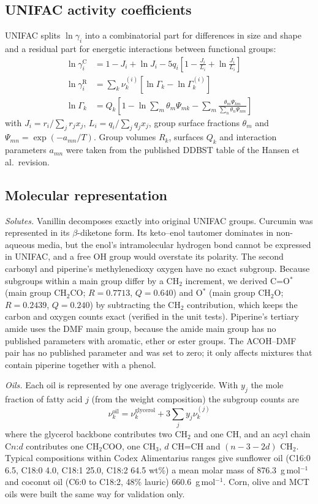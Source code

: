 \documentclass[journal=jceaax,manuscript=article,layout=twocolumn]{achemso}
\begin{document}
\subsection{UNIFAC activity coefficients}
UNIFAC splits $\ln\gamma_i$ into a combinatorial part for differences in size and shape and a residual part for energetic interactions between functional groups:\cite{fredenslund1975}
\begin{align}
\ln\gamma_i^\mathrm{C} &= 1-J_i+\ln J_i-5q_i\left[1-\frac{J_i}{L_i}+\ln\frac{J_i}{L_i}\right]\\
\ln\gamma_i^\mathrm{R} &= \sum_k \nu_k^{(i)}\left[\ln\Gamma_k-\ln\Gamma_k^{(i)}\right]\\
\ln\Gamma_k &= Q_k\left[1-\ln\sum_m\theta_m\Psi_{mk}-\sum_m\frac{\theta_m\Psi_{km}}{\sum_n\theta_n\Psi_{nm}}\right]
\end{align}
with $J_i=r_i/\sum_j r_jx_j$, $L_i=q_i/\sum_j q_jx_j$, group surface fractions $\theta_m$ and $\Psi_{mn}=\exp(-a_{mn}/T)$. Group volumes $R_k$, surfaces $Q_k$ and interaction parameters $a_{mn}$ were taken from the published DDBST table of the Hansen et al.\ revision.\cite{hansen1991,ddbst}

\subsection{Molecular representation}
\textit{Solutes.} Vanillin decomposes exactly into original UNIFAC groups. Curcumin was represented in its $\beta$-diketone form. Its keto--enol tautomer dominates in non-aqueous media,\cite{manolova2014} but the enol's intramolecular hydrogen bond cannot be expressed in UNIFAC, and a free OH group would overstate its polarity. The second carbonyl and piperine's methylenedioxy oxygen have no exact subgroup. Because subgroups within a main group differ by a CH$_2$ increment, we derived C=O$^*$ (main group CH$_2$CO; $R=0.7713$, $Q=0.640$) and O$^*$ (main group CH$_2$O; $R=0.2439$, $Q=0.240$) by subtracting the CH$_2$ contribution, which keeps the carbon and oxygen counts exact (verified in the unit tests). Piperine's tertiary amide uses the DMF main group, because the amide main group has no published parameters with aromatic, ether or ester groups. The ACOH--DMF pair has no published parameter and was set to zero; it only affects mixtures that contain piperine together with a phenol.

\textit{Oils.} Each oil is represented by one average triglyceride. With $y_j$ the mole fraction of fatty acid $j$ (from the weight composition) the subgroup counts are
\begin{equation}
\nu_k^\mathrm{oil}=\nu_k^\mathrm{glycerol}+3\sum_j y_j\nu_k^{(j)}
\end{equation}
where the glycerol backbone contributes two CH$_2$ and one CH, and an acyl chain C$n$:$d$ contributes one CH$_2$COO, one CH$_3$, $d$ CH=CH and $(n-3-2d)$ CH$_2$. Typical compositions within Codex Alimentarius ranges\cite{codex} give sunflower oil (C16:0 6.5, C18:0 4.0, C18:1 25.0, C18:2 64.5 wt\%) a mean molar mass of 876.3~g\,mol$^{-1}$ and coconut oil (C6:0 to C18:2, 48\% lauric) 660.6~g\,mol$^{-1}$. Corn, olive and MCT oils were built the same way for validation only.
\end{document}
